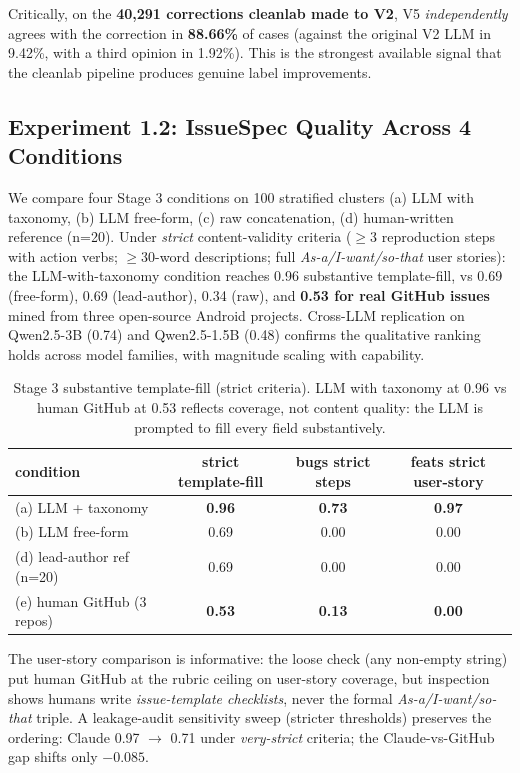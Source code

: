 \documentclass[sigconf, nonacm, anonymous, balance=false]{acmart}
\begin{document}
Critically, on the \textbf{40,291 corrections cleanlab made to V2}, V5 \emph{independently} agrees with the correction in \textbf{88.66\%} of cases (against the original V2 LLM in 9.42\%, with a third opinion in 1.92\%). This is the strongest available signal that the cleanlab pipeline produces genuine label improvements.

\subsection{Experiment 1.2: IssueSpec Quality Across 4 Conditions}\label{experiment-1.2-issuespec-quality-across-4-conditions}

We compare four Stage 3 conditions on 100 stratified clusters (a) LLM with taxonomy, (b) LLM free-form, (c) raw concatenation, (d) human-written reference (n=20). Under \emph{strict} content-validity criteria ($\geq$3 reproduction steps with action verbs; $\geq$30-word descriptions; full \emph{As-a/I-want/so-that} user stories): the LLM-with-taxonomy condition reaches 0.96 substantive template-fill, vs 0.69 (free-form), 0.69 (lead-author), 0.34 (raw), and \textbf{0.53 for real GitHub issues} mined from three open-source Android projects. Cross-LLM replication on Qwen2.5-3B (0.74) and Qwen2.5-1.5B (0.48) confirms the qualitative ranking holds across model families, with magnitude scaling with capability.

\begin{table}[t]\centering\footnotesize\setlength{\tabcolsep}{2pt}
\caption{Stage 3 substantive template-fill (strict criteria). LLM with taxonomy at 0.96 vs human GitHub at 0.53 reflects coverage, not content quality: the LLM is prompted to fill every field substantively.}\label{tab:stage3}
\begin{tabular}{lccc}\toprule
condition & strict template-fill & bugs strict steps & feats strict user-story \\\midrule
(a) LLM + taxonomy & \textbf{0.96} & \textbf{0.73} & \textbf{0.97} \\
(b) LLM free-form & 0.69 & 0.00 & 0.00 \\
(d) lead-author ref (n=20) & 0.69 & 0.00 & 0.00 \\
(e) human GitHub (3 repos) & \textbf{0.53} & \textbf{0.13} & \textbf{0.00} \\\bottomrule
\end{tabular}\end{table}

The user-story comparison is informative: the loose check (any non-empty string) put human GitHub at the rubric ceiling on user-story coverage, but inspection shows humans write \emph{issue-template checklists}, never the formal \emph{As-a/I-want/so-that} triple. A leakage-audit sensitivity sweep (stricter thresholds) preserves the ordering: Claude 0.97 $\rightarrow$ 0.71 under \emph{very-strict} criteria; the Claude-vs-GitHub gap shifts only $-0.085$.
\end{document}
